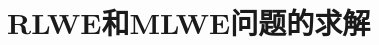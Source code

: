 \documentclass[12pt,a4paper]{article}
\numberwithin{equation}{section}
\begin{document}
\section{RLWE和MLWE问题的求解}




\end{document}
